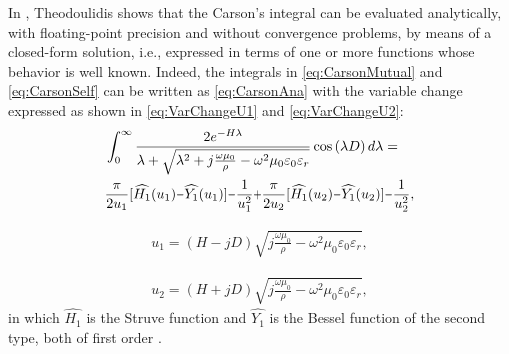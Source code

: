 \documentclass[conference]{IEEEtran}
\begin{document}
In \cite{Theodoulidis2015}, Theodoulidis shows that the Carson's integral can be evaluated analytically, with floating-point precision and without convergence problems, by means of a closed-form solution, i.e.,  expressed in terms of one or more functions whose behavior is well known. Indeed, the integrals in \eqref{eq:CarsonMutual} and \eqref{eq:CarsonSelf} can be written as \eqref{eq:CarsonAna} with the variable change expressed as shown in \eqref{eq:VarChangeU1} and \eqref{eq:VarChangeU2}:
\begin{equation}\label{eq:CarsonAna}
	\begin{aligned}
		&\int_{0}^{\infty}\frac{2e^{-H\lambda}}{\lambda+\sqrt{\lambda^2+j\frac{\omega\mu_{0}}{\rho}-\omega^2\mu_{0}\varepsilon_{0}\varepsilon_{r}}}\cos\left( \lambda D \right) d\lambda= \\
		&\frac{\pi}{2u_1}[\widehat{H_1}(u_1)\scalebox{0.75}[1.0]{\( - \)}\widehat{Y_1}(u_1)]\scalebox{0.75}[1.0]{\( - \)}\frac{1}{u_1^2}\scalebox{0.75}[1.0]{\( + \)}\frac{\pi}{2u_2}[\widehat{H_1}(u_2)\scalebox{0.75}[1.0]{\( - \)}\widehat{Y_1}(u_2)]\scalebox{0.75}[1.0]{\( - \)}\frac{1}{u_2^2},
	\end{aligned}
\end{equation}

\begin{equation}\label{eq:VarChangeU1}
	\begin{aligned}
		u_1=(H-jD)\sqrt{j\frac{\omega\mu_0}{\rho}-\omega^2\mu_0\varepsilon_0\varepsilon_r},
	\end{aligned}
\end{equation}

\begin{equation}\label{eq:VarChangeU2}
	\begin{aligned}
		u_2=(H+jD)\sqrt{j\frac{\omega\mu_0}{\rho}-\omega^2\mu_0\varepsilon_0\varepsilon_r},
	\end{aligned}
\end{equation}
in which $\widehat{H_1}$ is the Struve function and $\widehat{Y_1}$ is the Bessel function of the second type, both of first order \cite{Theodoulidis2015}.
\end{document}
